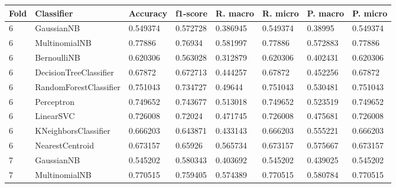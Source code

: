 \documentclass{article}
\begin{document}
\begin{table}[h]
\begin{tabular}{llllllll}
\textbf{Fold} & \textbf{Classifier}    & \textbf{Accuracy} & \textbf{f1-score} & \textbf{R. macro} & \textbf{R. micro} & \textbf{P. macro} & \textbf{P. micro} \\ \hline
6             & GaussianNB             & 0.549374          & 0.572728          & 0.386945              & 0.549374              & 0.38995                  & 0.549374                 \\
6             & MultinomialNB          & 0.77886           & 0.76934           & 0.581997              & 0.77886               & 0.572883                 & 0.77886                  \\
6             & BernoulliNB            & 0.620306          & 0.563028          & 0.312879              & 0.620306              & 0.402431                 & 0.620306                 \\
6             & DecisionTreeClassifier & 0.67872           & 0.672713          & 0.444257              & 0.67872               & 0.452256                 & 0.67872                  \\
6             & RandomForestClassifier & 0.751043          & 0.734727          & 0.49644               & 0.751043              & 0.530481                 & 0.751043                 \\
6             & Perceptron             & 0.749652          & 0.743677          & 0.513018              & 0.749652              & 0.523519                 & 0.749652                 \\
6             & LinearSVC              & 0.726008          & 0.72024           & 0.471745              & 0.726008              & 0.475681                 & 0.726008                 \\
6             & KNeighborsClassifier   & 0.666203          & 0.643871          & 0.433143              & 0.666203              & 0.555221                 & 0.666203                 \\
6             & NearestCentroid        & 0.673157          & 0.65926           & 0.565734              & 0.673157              & 0.575667                 & 0.673157                 \\
7             & GaussianNB             & 0.545202          & 0.580343          & 0.403692              & 0.545202              & 0.439025                 & 0.545202                 \\
7             & MultinomialNB          & 0.770515          & 0.759405          & 0.574389              & 0.770515              & 0.580784                 & 0.770515                 \\

\end{tabular}
\end{table}
\end{document}
